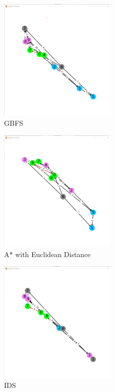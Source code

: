 \begin{figure}[h!]
    \centering
    \includegraphics[width=0.5\textwidth]{result/testcase2/greedy.png}
    \caption{GBFS}
\end{figure}
\begin{figure}[h!]
    \centering
    \includegraphics[width=0.5\textwidth]{result/testcase2/astar.png}
    \caption{A* with Euclidean Distance}
\end{figure}
\begin{figure}[h!]
    \centering
    \includegraphics[width=0.5\textwidth]{result/testcase2/ids.png}
    \caption{IDS}
\end{figure}
